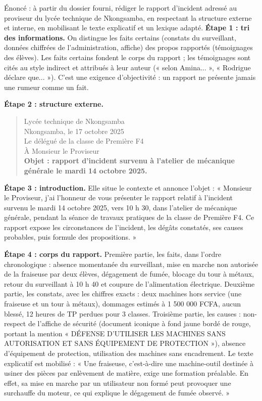\documentclass[11pt]{article}
\begin{document}
\begin{exoresolu}
Énoncé : à partir du dossier fourni, rédiger le rapport d'incident adressé au proviseur du lycée technique de Nkongsamba, en respectant la structure externe et interne, en mobilisant le texte explicatif et un lexique adapté.
\tcblower
\textbf{Étape 1 : tri des informations.} On distingue les faits certains (constats du surveillant, données chiffrées de l'administration, affiche) des propos rapportés (témoignages des élèves). Les faits certains fondent le corps du rapport ; les témoignages sont cités au style indirect et attribués à leur auteur (« selon Amina... », « Rodrigue déclare que... »). C'est une exigence d'objectivité : un rapport ne présente jamais une rumeur comme un fait.

\textbf{Étape 2 : structure externe.}
\begin{quote}
Lycée technique de Nkongsamba\\
Nkongsamba, le 17 octobre 2025\\
Le délégué de la classe de Première F4\\
À Monsieur le Proviseur\\
\textbf{Objet : rapport d'incident survenu à l'atelier de mécanique générale le mardi 14 octobre 2025.}
\end{quote}

\textbf{Étape 3 : introduction.} Elle situe le contexte et annonce l'objet : « Monsieur le Proviseur, j'ai l'honneur de vous présenter le rapport relatif à l'incident survenu le mardi 14 octobre 2025, vers 10 h 30, dans l'atelier de mécanique générale, pendant la séance de travaux pratiques de la classe de Première F4. Ce rapport expose les circonstances de l'incident, les dégâts constatés, ses causes probables, puis formule des propositions. »

\textbf{Étape 4 : corps du rapport.} Première partie, les faits, dans l'ordre chronologique : absence momentanée du surveillant, mise en marche non autorisée de la fraiseuse par deux élèves, dégagement de fumée, blocage du tour à métaux, retour du surveillant à 10 h 40 et coupure de l'alimentation électrique. Deuxième partie, les constats, avec les chiffres exacts : deux machines hors service (une fraiseuse et un tour à métaux), dommages estimés à 1 500 000 FCFA, aucun blessé, 12 heures de TP perdues pour 3 classes. Troisième partie, les causes : non-respect de l'affiche de sécurité (document iconique à fond jaune bordé de rouge, portant la mention « DÉFENSE D'UTILISER LES MACHINES SANS AUTORISATION ET SANS ÉQUIPEMENT DE PROTECTION »), absence d'équipement de protection, utilisation des machines sans encadrement. Le texte explicatif est mobilisé : « Une fraiseuse, c'est-à-dire une machine-outil destinée à usiner des pièces par enlèvement de matière, exige une formation préalable. En effet, sa mise en marche par un utilisateur non formé peut provoquer une surchauffe du moteur, ce qui explique le dégagement de fumée observé. »


\end{exoresolu}
\end{document}
